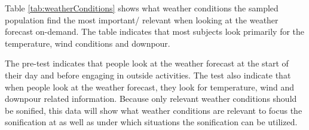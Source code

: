 Table \ref{tab:weatherConditions} shows what weather conditions the sampled population find the most important/ relevant when looking at the weather forecast on-demand.
The table indicates that most subjects look primarily for the temperature, wind conditions and downpour.
\bigskip

The pre-test indicates that people look at the weather forecast at the start of their day and before engaging in outside activities.
The test also indicate that when people look at the weather forecast, they look for temperature, wind and downpour related information.
Because only relevant weather conditions should be sonified, this data will show what weather conditions are relevant to focus the sonification at as well as under which situations the sonification can be utilized.
